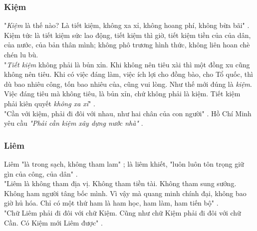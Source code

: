 \subsubsection{Kiệm}
"\textit{Kiệm} là thế nào? Là tiết kiệm, không xa xỉ, không hoang phí, không bừa bãi" \cite{HCMtt6}. Kiệm tức là tiết kiệm sức lao động, tiết kiệm thì giờ, tiết kiệm tiền của của dân, của nước, của bản thân mình; không phô trương hình thức, không liên hoan chè chén lu bù.\\
"\textit{Tiết kiệm} không phải là bủn xỉn. Khi không nên tiêu xài thì một đồng xu cũng không nên tiêu. Khi có việc đáng làm, việc ích lợi cho đồng bào, cho Tổ quốc, thì dù bao nhiêu công, tốn bao nhiêu của, cũng vui lòng. Như thế mới đúng là \textit{kiệm}. Việc đáng tiêu mà không tiêu, là bủn xỉn, chứ không phải là kiệm. Tiết kiệm phải kiên quyết \textit{không xa xỉ}" \cite{HCMtt6}.\\
"Cần với kiệm, phải đi đôi với nhau, như hai chân của con người" \cite{HCMtt6}. Hồ Chí Minh yêu cầu \textit{"Phải cần kiệm xây dựng nước nhà"} \cite{HCMtt13}.

\subsubsection{Liêm}
Liêm "là trong sạch, không tham lam" \cite{HCMtt6}; là liêm khiết, "luôn luôn tôn trọng giữ gìn của công, của dân" \cite{syllabus}.\\
"Liêm là không tham địa vị. Không tham tiền tài. Không tham sung sướng. Không ham người tâng bốc mình. Vì vậy mà quang minh chính đại, không bao giờ hủ hóa. Chỉ có một thứ ham là ham học, ham làm, ham tiến bộ" \cite{HCMtt5}.\\
"Chữ Liêm phải đi đôi với chữ Kiệm. Cũng như chữ Kiệm phải đi đôi với chữ Cần. Có Kiệm mới Liêm được" \cite{HCMtt6}.

